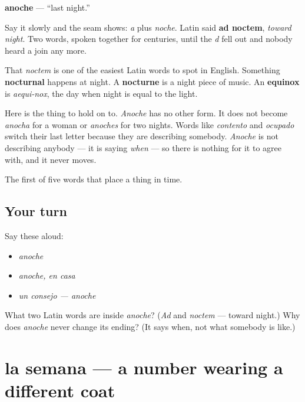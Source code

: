 \begin{cousinweb}
\textbf{anoche} — \textquotedblleft{}last night.\textquotedblright{}

Say it slowly and the seam shows: \emph{a} plus \emph{noche}. Latin said \textbf{ad noctem}, \emph{toward night}. Two words, spoken together for centuries, until the \emph{d} fell out and nobody heard a join any more.

That \emph{noctem} is one of the easiest Latin words to spot in English. Something \textbf{nocturnal} happens at night. A \textbf{nocturne} is a night piece of music. An \textbf{equinox} is \emph{aequi-nox}, the day when night is equal to the light.

Here is the thing to hold on to. \emph{Anoche} has no other form. It does not become \emph{anocha} for a woman or \emph{anoches} for two nights. Words like \emph{contento} and \emph{ocupado} switch their last letter because they are describing somebody. \emph{Anoche} is not describing anybody — it is saying \emph{when} — so there is nothing for it to agree with, and it never moves.
\end{cousinweb}

\begin{grammarlens}[title={What you've built}]
The first of five words that place a thing in time.
\end{grammarlens}

\subsection*{Your turn}
Say these aloud:

\begin{itemize}
\raggedright
  \item \emph{anoche}
  \item \emph{anoche, en casa}
  \item \emph{un consejo — anoche}
\end{itemize}

\begin{tcolorbox}[breakable,colback=teal!4,colframe=teal!35!black,title={Before you move on}]
What two Latin words are inside \emph{anoche}? (\emph{Ad} and \emph{noctem} — toward night.) Why does \emph{anoche} never change its ending? (It says when, not what somebody is like.)
\end{tcolorbox}
\section[la semana]{la semana — a number wearing a different coat}


